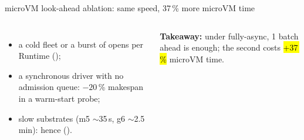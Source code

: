\begin{frame}{microVM look-ahead ablation: same speed, 37\,\% more microVM time}
\begin{columns}[T]
\begin{itemize}
\item a cold fleet or a burst of opens per Runtime ();
\item a synchronous driver with no admission queue: $-20$\,\% makespan in a warm-start probe;
\item slow substrates (m5 $\sim$35\,s, g6 $\sim$2.5\,min): hence  ().
\end{itemize}
\vspace{1mm}
\colorbox{panel}{\parbox{\dimexpr\linewidth-2\fboxsep}{\scriptsize\textbf{Takeaway:} under fully-async, 1 batch ahead is enough; the second costs \hl{+37\,\%} microVM time.}}
\end{columns}
\end{frame}

